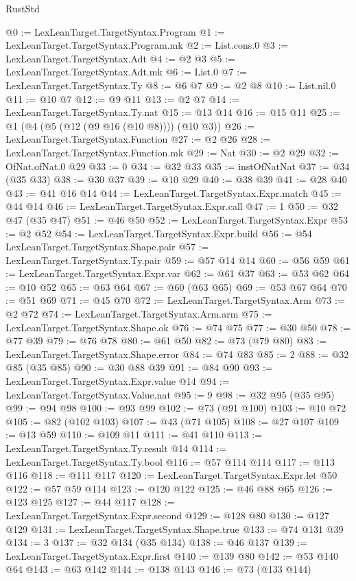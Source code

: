 \begin{lexlean}{RustStd}
\begin{coremodule}
@0 := LexLeanTarget.TargetSyntax.Program
@1 := LexLeanTarget.TargetSyntax.Program.mk
@2 := List.cons.{0}
@3 := LexLeanTarget.TargetSyntax.Adt
@4 := @2 @3
@5 := LexLeanTarget.TargetSyntax.Adt.mk
@6 := List.{0}
@7 := LexLeanTarget.TargetSyntax.Ty
@8 := @6 @7
@9 := @2 @8
@10 := List.nil.{0}
@11 := @10 @7
@12 := @9 @11
@13 := @2 @7
@14 := LexLeanTarget.TargetSyntax.Ty.nat
@15 := @13 @14
@16 := @15 @11
@25 := @1 (@4 (@5 (@12 (@9 @16 (@10 @8)))) (@10 @3))
@26 := LexLeanTarget.TargetSyntax.Function
@27 := @2 @26
@28 := LexLeanTarget.TargetSyntax.Function.mk
@29 := Nat
@30 := @2 @29
@32 := OfNat.ofNat.{0} @29
@33 := 0
@34 := @32 @33
@35 := instOfNatNat
@37 := @34 (@35 @33)
@38 := @30 @37
@39 := @10 @29
@40 := @38 @39
@41 := @28 @40
@43 := @41 @16 @14
@44 := LexLeanTarget.TargetSyntax.Expr.match
@45 := @44 @14
@46 := LexLeanTarget.TargetSyntax.Expr.call
@47 := 1
@50 := @32 @47 (@35 @47)
@51 := @46 @50
@52 := LexLeanTarget.TargetSyntax.Expr
@53 := @2 @52
@54 := LexLeanTarget.TargetSyntax.Expr.build
@56 := @54 LexLeanTarget.TargetSyntax.Shape.pair
@57 := LexLeanTarget.TargetSyntax.Ty.pair
@59 := @57 @14 @14
@60 := @56 @59
@61 := LexLeanTarget.TargetSyntax.Expr.var
@62 := @61 @37
@63 := @53 @62
@64 := @10 @52
@65 := @63 @64
@67 := @60 (@63 @65)
@69 := @53 @67 @64
@70 := @51 @69
@71 := @45 @70
@72 := LexLeanTarget.TargetSyntax.Arm
@73 := @2 @72
@74 := LexLeanTarget.TargetSyntax.Arm.arm
@75 := LexLeanTarget.TargetSyntax.Shape.ok
@76 := @74 @75
@77 := @30 @50
@78 := @77 @39
@79 := @76 @78
@80 := @61 @50
@82 := @73 (@79 @80)
@83 := LexLeanTarget.TargetSyntax.Shape.error
@84 := @74 @83
@85 := 2
@88 := @32 @85 (@35 @85)
@90 := @30 @88 @39
@91 := @84 @90
@93 := LexLeanTarget.TargetSyntax.Expr.value @14
@94 := LexLeanTarget.TargetSyntax.Value.nat
@95 := 9
@98 := @32 @95 (@35 @95)
@99 := @94 @98
@100 := @93 @99
@102 := @73 (@91 @100)
@103 := @10 @72
@105 := @82 (@102 @103)
@107 := @43 (@71 @105)
@108 := @27 @107
@109 := @13 @59
@110 := @109 @11
@111 := @41 @110
@113 := LexLeanTarget.TargetSyntax.Ty.result @14
@114 := LexLeanTarget.TargetSyntax.Ty.bool
@116 := @57 @114 @114
@117 := @113 @116
@118 := @111 @117
@120 := LexLeanTarget.TargetSyntax.Expr.let @50
@122 := @57 @59 @114
@123 := @120 @122
@125 := @46 @88 @65
@126 := @123 @125
@127 := @44 @117
@128 := LexLeanTarget.TargetSyntax.Expr.second
@129 := @128 @80
@130 := @127 @129
@131 := LexLeanTarget.TargetSyntax.Shape.true
@133 := @74 @131 @39
@134 := 3
@137 := @32 @134 (@35 @134)
@138 := @46 @137
@139 := LexLeanTarget.TargetSyntax.Expr.first
@140 := @139 @80
@142 := @53 @140 @64
@143 := @63 @142
@144 := @138 @143
@146 := @73 (@133 @144)

\end{coremodule}
\end{lexlean}
